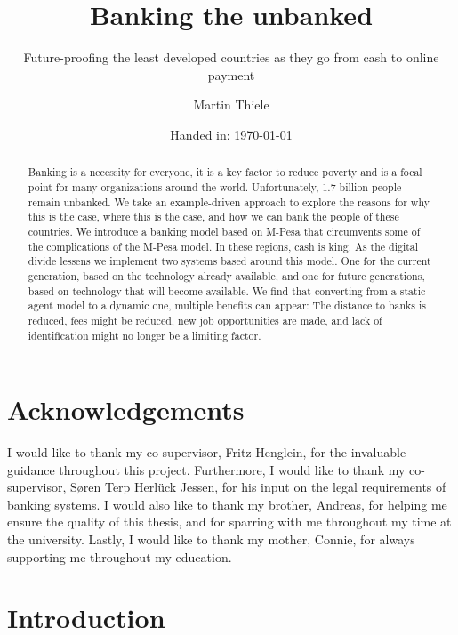 \documentclass[11pt, a4paper]{article}
\author{Martin Thiele}
\title{Banking the unbanked}
\subtitle{Future-proofing the least developed countries as they go from cash to online payment}
\date{Handed in: \today}
\begin{document}
\renewcommand{\bibname}{References}


\maketitle

\begin{abstract}
\noindent Banking is a necessity for everyone, it is a key factor to reduce poverty and is a focal point for many organizations around the world. Unfortunately, 1.7 billion people remain unbanked. We take an example-driven approach to explore the reasons for why this is the case, where this is the case, and how we can bank the people of these countries. We introduce a banking model based on M-Pesa that circumvents some of the complications of the M-Pesa model. In these regions, cash is king. As the digital divide lessens we implement two systems based around this model. One for the current generation, based on the technology already available, and one for future generations, based on technology that will become available. We find that converting from a static agent model to a dynamic one, multiple benefits can appear: The distance to banks is reduced, fees might be reduced, new job opportunities are made, and lack of identification might no longer be a limiting factor.
\end{abstract}

\clearpage

\section*{Acknowledgements}
I would like to thank my co-supervisor, Fritz Henglein, for the invaluable guidance throughout this project. Furthermore, I would like to thank my co-supervisor, Søren Terp Herlück Jessen, for his input on the legal requirements of banking systems. I would also like to thank my brother, Andreas, for helping me ensure the quality of this thesis, and for sparring with me throughout my time at the university. Lastly, I would like to thank my mother, Connie, for always supporting me throughout my education.

\clearpage

\tableofcontents
\clearpage


\section{Introduction}
\end{document}
